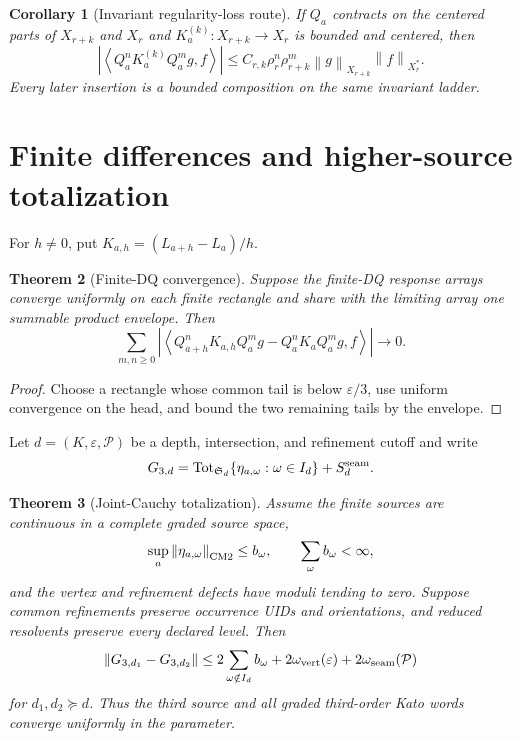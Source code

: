 \documentclass[11pt,reqno]{amsart}
\newtheorem{theorem}{Theorem}[section]
\newtheorem{corollary}[theorem]{Corollary}
\theoremstyle{definition}
\theoremstyle{remark}
\newcommand{\Tot}{\operatorname{Tot}}
\newcommand{\norm}[1]{\left\lVert #1\right\rVert}
\newcommand{\abs}[1]{\left\lvert #1\right\rvert}
\newcommand{\pair}[2]{\left\langle #1,#2\right\rangle}
\begin{document}
\begin{corollary}[Invariant regularity-loss route]\label{cor:loss}
If $Q_a$ contracts on the centered parts of $X_{r+k}$ and $X_r$ and
$K_a^{(k)}:X_{r+k}\to X_r$ is bounded and centered, then
\[
 \abs{\pair{Q_a^nK_a^{(k)}Q_a^m g}{f}}
 \le C_{r,k}\rho_r^n\rho_{r+k}^m
 \norm g_{X_{r+k}}\norm f_{X_r^*}.
\]
Every later insertion is a bounded composition on the same invariant ladder.
\end{corollary}

\section{Finite differences and higher-source totalization}\label{sec:higher}
For $h\ne0$, put $K_{a,h}=(L_{a+h}-L_a)/h$.

\begin{theorem}[Finite-DQ convergence]\label{thm:fdq}
Suppose the finite-DQ response arrays converge uniformly on each finite
rectangle and share with the limiting array one summable product envelope.
Then
\[
 \sum_{m,n\ge0}
 \abs{\pair{Q_{a+h}^nK_{a,h}Q_a^mg-Q_a^nK_aQ_a^mg}{f}}
 \longrightarrow0.
\]
\end{theorem}

\begin{proof}
Choose a rectangle whose common tail is below $\varepsilon/3$, use uniform
convergence on the head, and bound the two remaining tails by the envelope.
\end{proof}

Let $d=(K,\varepsilon,\mathcal P)$ be a depth, intersection, and refinement
cutoff and write
\[
 G_{3,d}=\Tot_{\mathfrak S_d}
 \{\eta_{a,\omega}:\omega\in I_d\}+S_d^{\rm seam}.
\]

\begin{theorem}[Joint-Cauchy totalization]\label{thm:totalization}
Assume the finite sources are continuous in a complete graded source space,
\[
 \sup_a\norm{\eta_{a,\omega}}_{\rm CM2}\le b_\omega,
 \qquad\sum_\omega b_\omega<\infty,
\]
and the vertex and refinement defects have moduli tending to zero.  Suppose
common refinements preserve occurrence UIDs and orientations, and reduced
resolvents preserve every declared level.  Then
\[
 \norm{G_{3,d_1}-G_{3,d_2}}
 \le2\sum_{\omega\notin I_d}b_\omega
 +2\omega_{\rm vert}(\varepsilon)
 +2\omega_{\rm seam}(\mathcal P)
\]
for $d_1,d_2\succeq d$.  Thus the third source and all graded third-order Kato
words converge uniformly in the parameter.
\end{theorem}
\end{document}
